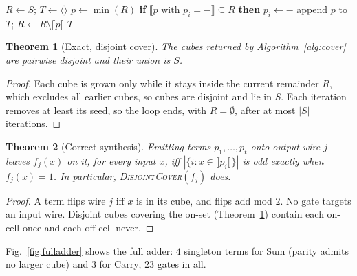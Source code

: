 \documentclass[conference]{IEEEtran}
\newcommand{\Algo}[1]{\textup{\textsc{#1}}}
\theoremstyle{plain}
\newtheorem{theorem}{Theorem}
\begin{document}
\begin{algorithm}[t]
\caption{\Algo{DisjointCover}$(S)$}
\label{alg:cover}
\begin{algorithmic}[1]
\State $R \gets S$; $T\gets\langle\rangle$
  \State $p \gets \min(R)$
  \Comment{\Algo{GrowCube}}
    \State \textbf{if} $\llbracket p \text{ with } p_i{=}{-}\rrbracket \subseteq R$ \textbf{then} $p_i \gets -$
  \EndFor
  \State append $p$ to $T$; $R \gets R\setminus\llbracket p\rrbracket$
\EndWhile
\State \Return $T$
\end{algorithmic}
\end{algorithm}

\begin{theorem}[Exact, disjoint cover]
\label{thm:exactness}
The cubes returned by Algorithm~\ref{alg:cover} are pairwise disjoint and
their union is $S$.
\end{theorem}
\begin{proof}
Each cube is grown only while it stays inside the current remainder $R$,
which excludes all earlier cubes, so cubes are disjoint and lie in $S$.
Each iteration removes at least its seed, so the loop ends, with $R=\emptyset$,
after at most $|S|$ iterations.
\end{proof}

\begin{theorem}[Correct synthesis]
\label{thm:correctness}
Emitting terms $p_1,\dots,p_t$ onto output wire $j$ leaves $f_j(x)$ on it,
for every input $x$, iff $|\{i : x\in\llbracket p_i\rrbracket\}|$ is odd
exactly when $f_j(x)=1$. In particular, \Algo{DisjointCover}$(f_j)$
does.
\end{theorem}
\begin{proof}
A term flips wire $j$ iff $x$ is in its cube, and flips add mod $2$. No
gate targets an input wire. Disjoint cubes covering the on-set
(Theorem~\ref{thm:exactness}) contain each on-cell once and each
off-cell never.
\end{proof}

Fig.~\ref{fig:fulladder} shows the full adder: $4$ singleton terms for
$\mathrm{Sum}$ (parity admits no larger cube) and $3$ for
$\mathrm{Carry}$, $23$ gates in all.
\end{document}
